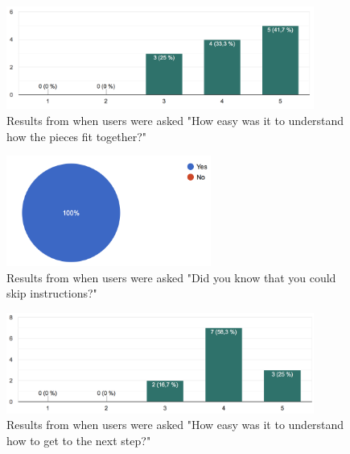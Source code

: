 \begin{figure}[hbtp]
\begin{center}
\includegraphics[width = 0.9\textwidth]{./Images/easyToUnderstand.png}
\caption{Results from when users were asked "How easy was it to understand how the pieces fit together?"}
\label{fig:question2}
\end{center}
\end{figure}

\begin{figure}[hbtp]
\begin{center}
\includegraphics[width = 0.6\textwidth]{./Images/knowToSkip.png}
\caption{Results from when users were asked "Did you know that you could skip instructions?"}
\label{fig:question3}
\end{center}
\end{figure}

\begin{figure}[hbtp]
\begin{center}
\includegraphics[width = 0.9\textwidth]{./Images/easyToUse.png}
\caption{Results from when users were asked "How easy was it to understand how to get to the next step?"}
\label{fig:question4}
\end{center}
\end{figure}

